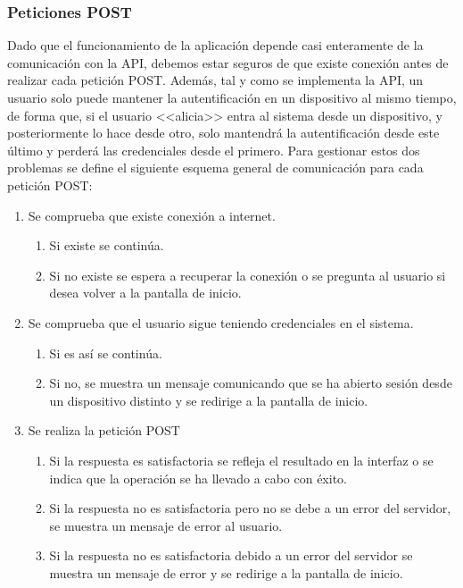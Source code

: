 \subsubsection{Peticiones POST}
Dado que el funcionamiento de la aplicación depende casi enteramente de la comunicación con la API, debemos estar seguros de que existe conexión antes de realizar cada petición POST. Además, tal y como se implementa la API, un usuario solo puede mantener la autentificación en un dispositivo al mismo tiempo, de forma que, si el usuario <<alicia>> entra al sistema desde un dispositivo, y posteriormente lo hace desde otro, solo mantendrá la autentificación desde este último y perderá las credenciales desde el primero. Para gestionar estos dos problemas se define el siguiente esquema general de comunicación para cada petición POST:  

\begin{minipage}{\linewidth}
\begin{enumerate}
	\item Se comprueba que existe conexión a internet.
	\begin{enumerate}
		\item Si existe se continúa. 
		\item Si no existe se espera a recuperar la conexión o se pregunta al usuario si desea volver a la pantalla de inicio. 
	\end{enumerate}
	\item Se comprueba que el usuario sigue teniendo credenciales en el sistema.
	\begin{enumerate}
		\item Si es así se continúa. 
		\item Si no, se muestra un mensaje comunicando que se ha abierto sesión desde un dispositivo distinto y se redirige a la pantalla de inicio. 
	\end{enumerate}
	\item Se realiza la petición POST
	\begin{enumerate}
		\item Si la respuesta es satisfactoria se refleja el resultado en la interfaz o se indica que la operación se ha llevado a cabo con éxito.  
		\item Si la respuesta no es satisfactoria pero no se debe a un error del servidor, se muestra un mensaje de error al usuario. 
		\item Si la respuesta no es satisfactoria debido a un error del servidor se muestra un mensaje de error y se redirige a la pantalla de inicio. 
	\end{enumerate}
\end{enumerate}
\end{minipage}

